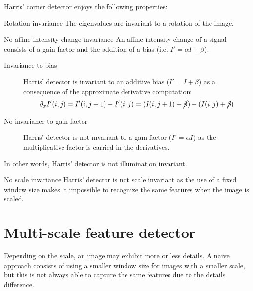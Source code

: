 Harris' corner detector enjoys the following properties:
\begin{descriptionlist}
    \item[Rotation invariance] 
        The eigenvalues are invariant to a rotation of the image.
    
    \item[No affine intensity change invariance]
        An affine intensity change of a signal consists of a gain factor and the addition of a bias (i.e. $I' = \alpha I + \beta$).
        \begin{description}
            \item[Invariance to bias]
                Harris' detector is invariant to an additive bias ($I' = I + \beta$) as a consequence of the approximate derivative computation:
                \[ 
                    \partial_x I'(i, j) = I'(i, j+1) - I'(i, j) = (I(i, j+1) + \cancel{\beta}) - (I(i, j) + \cancel{\beta})
                \]
            \item[No invariance to gain factor]
                Harris' detector is not invariant to a gain factor ($I' = \alpha I$) as the multiplicative factor is carried in the derivatives.
        \end{description}
        \begin{remark}
            In other words, Harris' detector is not illumination invariant.
        \end{remark}

    \item[No scale invariance]
        Harris' detector is not scale invariant as the use of a fixed window size makes it impossible to recognize the same features when the image is scaled.
\end{descriptionlist}



\section{Multi-scale feature detector}


Depending on the scale, an image may exhibit more or less details.
A naive approach consists of using a smaller window size for images with a smaller scale, 
but this is not always able to capture the same features due to the details difference.

